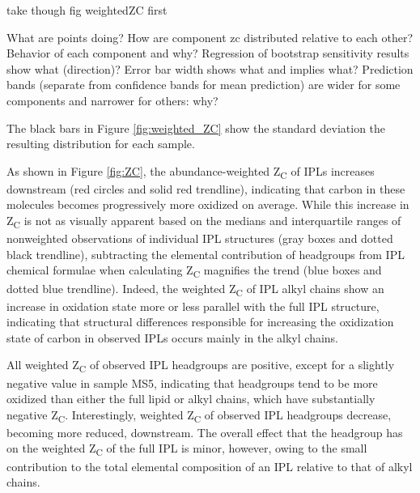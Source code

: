 take though fig weightedZC first

What are points doing? How are component zc distributed relative to each other? Behavior of each component and why? Regression of bootstrap sensitivity results show what (direction)? Error bar width shows what and implies what? Prediction bands (separate from confidence bands for mean prediction) are wider for some components and narrower for others: why?

The black bars in Figure \ref{fig:weighted_ZC} show the standard deviation the resulting distribution for each sample.


As shown in Figure \ref{fig:ZC}, the abundance-weighted Z\textsubscript{C} of IPLs increases downstream (red circles and solid red trendline), indicating that carbon in these molecules becomes progressively more oxidized on average. While this increase in Z\textsubscript{C} is not as visually apparent based on the medians and interquartile ranges of nonweighted observations of individual IPL structures (gray boxes and dotted black trendline), subtracting the elemental contribution of headgroups from IPL chemical formulae when calculating Z\textsubscript{C} magnifies the trend (blue boxes and dotted blue trendline). Indeed, the weighted Z\textsubscript{C} of IPL alkyl chains show an increase in oxidation state more or less parallel with the full IPL structure, indicating that structural differences responsible for increasing the oxidization state of carbon in observed IPLs occurs mainly in the alkyl chains.

All weighted Z\textsubscript{C} of observed IPL headgroups are positive, except for a slightly negative value in sample MS5, indicating that headgroups tend to be more oxidized than either the full lipid or alkyl chains, which have substantially negative Z\textsubscript{C}.
Interestingly, weighted Z\textsubscript{C} of observed IPL headgroups decrease, becoming more reduced, downstream. The overall effect that the headgroup has on the weighted Z\textsubscript{C} of the full IPL is minor, however, owing to the small contribution to the total elemental composition of an IPL relative to that of alkyl chains.



